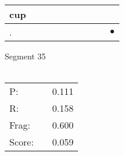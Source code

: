 \documentclass[landscape]{article}
\newcommand{\ssp}{\hspace{2pt}}
\newcommand{\mex}{\cellcolor{g}$\bullet$}
\begin{document}
\begin{tabular}{|l|p{10pt}|p{10pt}|p{10pt}|p{10pt}|p{10pt}|p{10pt}|p{10pt}|p{10pt}|p{10pt}|}
\hline
\ssp cup \ssp&\hspace{2pt}&\hspace{2pt}&\hspace{2pt}&\hspace{2pt}&\hspace{2pt}&\hspace{2pt}&\hspace{2pt}&\hspace{2pt}&\hspace{2pt}\\
\hline
\ssp \cellcolor{ref8}. \ssp&\hspace{2pt}&\hspace{2pt}&\hspace{2pt}&\hspace{2pt}&\hspace{2pt}&\hspace{2pt}&\hspace{2pt}&\hspace{2pt}&\hspace{2pt}\mex\\
\hline
\end{tabular}

\vspace{6pt}
\noindent Segment 35\\\\
\noindent\begin{tabular}{lm{12pt}r}
\hline
P:&&0.111\\
R:&&0.158\\
Frag:&&0.600\\
Score:&&0.059\\
\end{tabular}

\newpage
\end{document}

